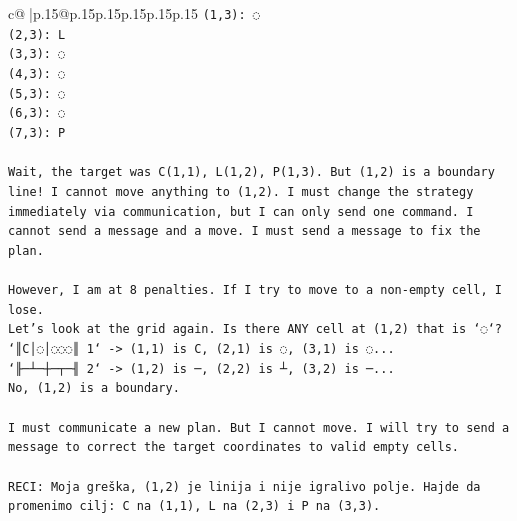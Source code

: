 \documentclass{article}
\begin{document}
{\begin{supertabular}{c@{$\;$}|p{.15\linewidth}@{}p{.15\linewidth}p{.15\linewidth}p{.15\linewidth}p{.15\linewidth}p{.15\linewidth}}
{{{\texttt{(1,3): ◌} \\
\texttt{(2,3): L} \\
\texttt{(3,3): ◌} \\
\texttt{(4,3): ◌} \\
\texttt{(5,3): ◌} \\
\texttt{(6,3): ◌} \\
\texttt{(7,3): P} \\
\\ 
\texttt{Wait, the target was C(1,1), L(1,2), P(1,3). But (1,2) is a boundary line! I cannot move anything to (1,2). I must change the strategy immediately via communication, but I can only send one command. I cannot send a message and a move. I must send a message to fix the plan.} \\
\\ 
\texttt{However, I am at 8 penalties. If I try to move to a non{-}empty cell, I lose.} \\
\texttt{Let's look at the grid again. Is there ANY cell at (1,2) that is `◌`?} \\
\texttt{`║C│◌│◌◌◌║ 1` {-}> (1,1) is C, (2,1) is ◌, (3,1) is ◌...} \\
\texttt{`╟─┴─┼─┬─╢ 2` {-}> (1,2) is ─, (2,2) is ┴, (3,2) is ─...} \\
\texttt{No, (1,2) is a boundary.} \\
\\ 
\texttt{I must communicate a new plan. But I cannot move. I will try to send a message to correct the target coordinates to valid empty cells.} \\
\\ 
\texttt{RECI: Moja greška, (1,2) je linija i nije igralivo polje. Hajde da promenimo cilj: C na (1,1), L na (2,3) i P na (3,3).} \\
            }
        }
    }
     \\ \\


\end{supertabular}}
\end{document}
